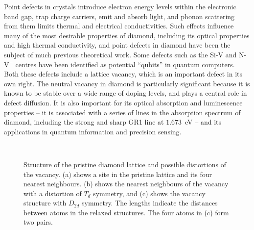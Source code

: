 \documentclass[aps,showpacs,prb,reprint,superscriptaddress,longbibliography]{revtex4-1}
\begin{document}
Point defects in crystals introduce electron energy levels within the
electronic band gap, trap charge carriers, emit and absorb light, and
phonon scattering from them limits thermal and electrical
conductivities.\cite{stoneham_theory_1975,schroder_quantum_2016} Such
effects influence many of the most desirable properties of diamond,
including its optical properties and high thermal conductivity, and
point defects in diamond have been the subject of much previous
theoretical
work.\cite{freysoldt_first-principles_2014,drabold_theory_2007} Some
defects such as the Si-V\cite{rogers_electronic_2014,gali_ab_2013} and
N-V$^-$ centres\cite{maurer_room-temperature_2012} have been
identified as potential ``qubits'' in quantum
computers.\cite{rogers_all-optical_2014,sipahigil_indistinguishable_2014,balasubramanian_ultralong_2009,bernien_heralded_2013,knowles_observing_2014,dolde_room-temperature_2013,schroder_quantum_2016}
Both these defects include a lattice vacancy, which is an important
defect in its own right. The neutral vacancy in diamond is
particularly significant because it is known to be stable over a wide
range of doping levels,\cite{corsetti_system-size_2011} and plays a
central role in defect diffusion.\cite{hood_quantum_2003} It is also
important for its optical absorption and luminescence properties -- it
is associated with a series of lines in the absorption spectrum of
diamond, including the strong and sharp GR1 line at
$1.673$~eV\cite{walker_optical_1979} -- and its applications in
quantum information\cite{wrachtrup_processing_2006} and precision
sensing.\cite{schirhagl_nitrogen-vacancy_2014}

\begin{figure*}
\begin{center}
~
~
\end{center}
\caption{Structure of the pristine diamond lattice and possible
  distortions of the vacancy. (a) shows a site in the pristine
  lattice and its four nearest neighbours. (b) shows the nearest
  neighbours of the vacancy with a distortion of $T_d$ symmetry, and
  (c) shows the vacancy structure with $D_{2d}$ symmetry. The lengths 
  indicate the distances
  between atoms in the relaxed structures.  The four atoms in (c) form
  two pairs.} \label{fig:Symmetries}
\end{figure*}
\end{document}
